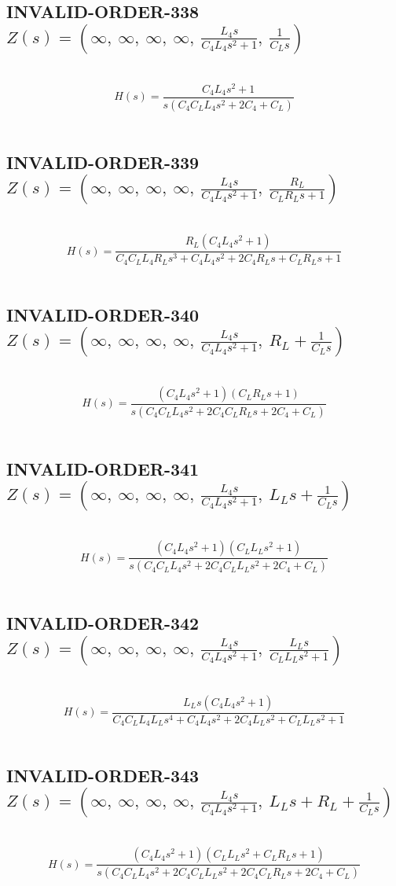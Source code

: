 \documentclass{article}
\begin{document}
\subsection{INVALID-ORDER-338 $Z(s) = \left( \infty, \  \infty, \  \infty, \  \infty, \  \frac{L_{4} s}{C_{4} L_{4} s^{2} + 1}, \  \frac{1}{C_{L} s}\right)$ } \ 
\textbf{\[H(s) = \frac{C_{4} L_{4} s^{2} + 1}{s \left(C_{4} C_{L} L_{4} s^{2} + 2 C_{4} + C_{L}\right)}\] } \ 
\subsection{INVALID-ORDER-339 $Z(s) = \left( \infty, \  \infty, \  \infty, \  \infty, \  \frac{L_{4} s}{C_{4} L_{4} s^{2} + 1}, \  \frac{R_{L}}{C_{L} R_{L} s + 1}\right)$ } \ 
\textbf{\[H(s) = \frac{R_{L} \left(C_{4} L_{4} s^{2} + 1\right)}{C_{4} C_{L} L_{4} R_{L} s^{3} + C_{4} L_{4} s^{2} + 2 C_{4} R_{L} s + C_{L} R_{L} s + 1}\] } \ 
\subsection{INVALID-ORDER-340 $Z(s) = \left( \infty, \  \infty, \  \infty, \  \infty, \  \frac{L_{4} s}{C_{4} L_{4} s^{2} + 1}, \  R_{L} + \frac{1}{C_{L} s}\right)$ } \ 
\textbf{\[H(s) = \frac{\left(C_{4} L_{4} s^{2} + 1\right) \left(C_{L} R_{L} s + 1\right)}{s \left(C_{4} C_{L} L_{4} s^{2} + 2 C_{4} C_{L} R_{L} s + 2 C_{4} + C_{L}\right)}\] } \ 
\subsection{INVALID-ORDER-341 $Z(s) = \left( \infty, \  \infty, \  \infty, \  \infty, \  \frac{L_{4} s}{C_{4} L_{4} s^{2} + 1}, \  L_{L} s + \frac{1}{C_{L} s}\right)$ } \ 
\textbf{\[H(s) = \frac{\left(C_{4} L_{4} s^{2} + 1\right) \left(C_{L} L_{L} s^{2} + 1\right)}{s \left(C_{4} C_{L} L_{4} s^{2} + 2 C_{4} C_{L} L_{L} s^{2} + 2 C_{4} + C_{L}\right)}\] } \ 
\subsection{INVALID-ORDER-342 $Z(s) = \left( \infty, \  \infty, \  \infty, \  \infty, \  \frac{L_{4} s}{C_{4} L_{4} s^{2} + 1}, \  \frac{L_{L} s}{C_{L} L_{L} s^{2} + 1}\right)$ } \ 
\textbf{\[H(s) = \frac{L_{L} s \left(C_{4} L_{4} s^{2} + 1\right)}{C_{4} C_{L} L_{4} L_{L} s^{4} + C_{4} L_{4} s^{2} + 2 C_{4} L_{L} s^{2} + C_{L} L_{L} s^{2} + 1}\] } \ 
\subsection{INVALID-ORDER-343 $Z(s) = \left( \infty, \  \infty, \  \infty, \  \infty, \  \frac{L_{4} s}{C_{4} L_{4} s^{2} + 1}, \  L_{L} s + R_{L} + \frac{1}{C_{L} s}\right)$ } \ 
\textbf{\[H(s) = \frac{\left(C_{4} L_{4} s^{2} + 1\right) \left(C_{L} L_{L} s^{2} + C_{L} R_{L} s + 1\right)}{s \left(C_{4} C_{L} L_{4} s^{2} + 2 C_{4} C_{L} L_{L} s^{2} + 2 C_{4} C_{L} R_{L} s + 2 C_{4} + C_{L}\right)}\] } \ 
\end{document}
